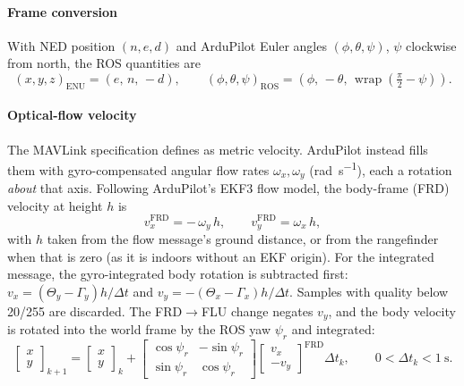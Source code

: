 \paragraph{Frame conversion} With NED position $(n,e,d)$ and ArduPilot Euler angles
$(\phi,\theta,\psi)$, $\psi$ clockwise from north, the ROS quantities are
\begin{equation}
  (x,y,z)_\text{ENU} = (e,\,n,\,-d), \qquad
  (\phi,\theta,\psi)_\text{ROS} = \left(\phi,\,-\theta,\,\operatorname{wrap}\!\left(\tfrac{\pi}{2}-\psi\right)\right).
  \label{eq:ned-enu}
\end{equation}

\paragraph{Optical-flow velocity} The MAVLink specification defines
 as metric velocity. ArduPilot instead fills them with
gyro-compensated angular flow rates $\omega_x,\omega_y$ (\si{\radian\per\second}),
each a rotation \emph{about} that axis. Following ArduPilot's EKF3 flow model, the
body-frame (FRD) velocity at height $h$ is
\begin{equation}
  v_{x}^{\text{FRD}} = -\,\omega_y\,h, \qquad v_{y}^{\text{FRD}} = \omega_x\,h,
  \label{eq:flow-ap}
\end{equation}
with $h$ taken from the flow message's ground distance, or from the rangefinder when
that is zero (as it is indoors without an EKF origin). For the integrated
 message, the gyro-integrated body rotation is subtracted
first: $v_x = (\Theta_y - \Gamma_y)h/\Delta t$ and
$v_y = -(\Theta_x - \Gamma_x)h/\Delta t$. Samples with quality below 20/255 are
discarded. The FRD$\rightarrow$FLU change negates $v_y$, and the body velocity is
rotated into the world frame by the ROS yaw $\psi_r$ and integrated:
\begin{equation}
  \begin{bmatrix} x \\ y \end{bmatrix}_{k+1} =
  \begin{bmatrix} x \\ y \end{bmatrix}_{k} +
  \begin{bmatrix} \cos\psi_r & -\sin\psi_r \\ \sin\psi_r & \cos\psi_r \end{bmatrix}
  \begin{bmatrix} v_x \\ -v_y \end{bmatrix}^{\!\text{FRD}} \Delta t_k ,
  \qquad 0 < \Delta t_k < \SI{1}{\second}.
  \label{eq:flow-integrate}
\end{equation}

